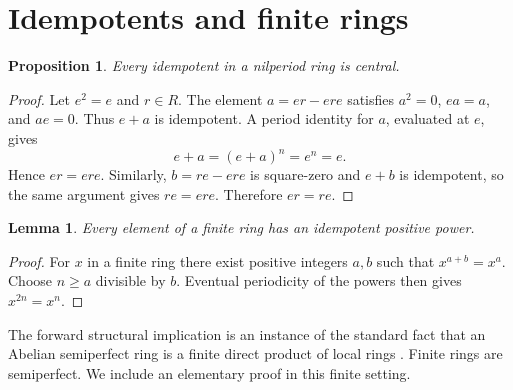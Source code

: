 \documentclass[11pt]{article}
\newtheorem{lemma}[theorem]{Lemma}
\newtheorem{proposition}[theorem]{Proposition}
\theoremstyle{remark}
\begin{document}
\section{Idempotents and finite rings}
\begin{proposition}\label{prop:central}
Every idempotent in a nilperiod ring is central.
\end{proposition}
\begin{proof}
Let $e^2=e$ and $r\in R$. The element $a=er-ere$ satisfies
$a^2=0$, $ea=a$, and $ae=0$. Thus $e+a$ is idempotent.
A period identity for $a$, evaluated at $e$, gives
\[
 e+a=(e+a)^n=e^n=e.
\]
Hence $er=ere$. Similarly, $b=re-ere$ is square-zero and $e+b$ is
idempotent, so the same argument gives $re=ere$. Therefore $er=re$.
\end{proof}

\begin{lemma}\label{lem:idempotent-power}
Every element of a finite ring has an idempotent positive power.
\end{lemma}
\begin{proof}
For $x$ in a finite ring there exist positive integers $a,b$ such that
$x^{a+b}=x^a$. Choose $n\geq a$ divisible by $b$. Eventual periodicity
of the powers then gives $x^{2n}=x^n$.
\end{proof}

The forward structural implication is an instance of the standard fact that
an Abelian semiperfect ring is a finite direct product of local rings
\cite[Proposition~2.6]{HLP}. Finite rings are semiperfect. We include an
elementary proof in this finite setting.
\end{document}
